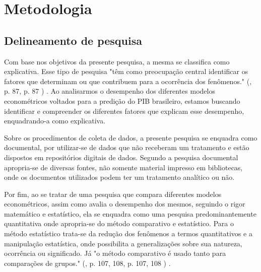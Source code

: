\documentclass[12pt]{article}%
\newcommand{\citem}[2][]{%
	(\citeauthoronline{#2}, \citeyear{#2}%
	\ifx#1\empty\else, #1\fi%
	)%
}
\begin{document}
	\newpage
	\section{Metodologia}
	\subsection{Delineamento de pesquisa}
	Com base nos objetivos da presente pesquisa, a mesma se classifica como explicativa. Esse tipo de pesquisa "têm como preocupação central identificar os fatores que determinam ou que contribuem para a ocorrência dos fenômenos." \citem[p. 87]{Gil}. Ao analisarmos o desempenho dos diferentes modelos econométricos voltados para a predição do PIB brasileiro, estamos buscando identificar e compreender os diferentes fatores que explicam esse desempenho, enquadrando-a como explicativa.
	
	Sobre os procedimentos de coleta de dados, a presente pesquisa se enquadra como documental, por utilizar-se de dados que não receberam um tratamento e estão dispostos em repositórios digitais de dados. Segundo  a pesquisa documental apropria-se de diversas fontes, não somente material impresso em bibliotecas, onde os documentos utilizados podem ter um tratamento analítico ou não.
	
	Por fim, ao se tratar de uma pesquisa que compara diferentes modelos econométricos, assim como avalia o desempenho dos mesmos, seguindo o rigor matemático e estatístico, ela se enquadra como uma pesquisa predominantemente quantitativa onde apropria-se do método comparativo e estatístico. Para  o método estatístico trata-se da redução dos fenômenos a termos quantitativos e a manipulação estatística, onde possibilita a generalizações sobre sua natureza, ocorrência ou significado. Já "o método comparativo é usado tanto para comparações de grupos." \citem[p. 107, 108]{LAKATOSMARCONI}.
\end{document}
